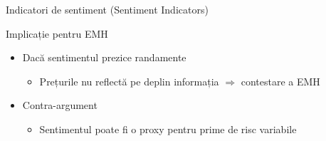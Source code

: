 \documentclass[9pt, aspectratio=169, t]{beamer}
\theoremstyle{definition}
\newenvironment{cminipage}[1]{%
    \par\noindent\hfill\begin{minipage}{#1}\ignorespaces
}{%
    \end{minipage}\hfill\null\par
}
\begin{document}
\begin{frame}[shrink=15]{Indicatori de sentiment (Sentiment Indicators)}
\begin{cminipage}{0.95\textwidth}
\vspace{0.1cm}
\begin{exampleblock}{Implicație pentru EMH}
\begin{itemize}\setlength{\itemsep}{0pt}
    \item Dacă sentimentul prezice randamente
    \begin{itemize}\setlength{\itemsep}{0pt}
        \item Prețurile nu reflectă pe deplin informația $\Rightarrow$ contestare a EMH
    \end{itemize}
    \item Contra-argument
    \begin{itemize}\setlength{\itemsep}{0pt}
        \item Sentimentul poate fi o proxy pentru prime de risc variabile
    \end{itemize}
\end{itemize}
\end{exampleblock}
\end{cminipage}
\end{frame}
\end{document}
